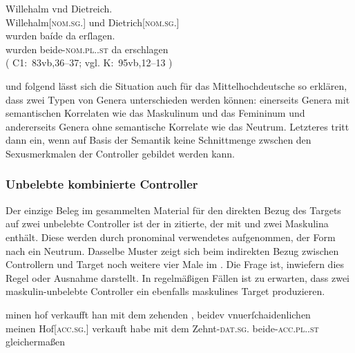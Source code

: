 \begin{exe}
\ex\label{ex:dietwill3}
		\gll Willehalm vnd Dietreich. \\
			Willehalm[\textsc{nom.sg.\MascM}] und Dietrich[\textsc{nom.sg.\MascM}] \\
	\sn \gll wurden baíde da erſlagen. \\
			wurden beide-\textsc{nom.pl.\MascM.st} da erschlagen \\
		\trans {}
			(%
				C1:~83vb,36--37; vgl.
				K:~95vb,12--13%
			)
\end{exe}

\citet[576]{wechsler2009} und \citet[182]{wechslerzlatic2003} folgend lässt
sich die Situation auch für das Mittelhochdeutsche so
erklären, dass zwei Typen von Genera unterschieden werden können:
einerseits Genera mit semantischen Korrelaten wie das Maskulinum und das
Femininum und andererseits Genera ohne semantische Korrelate wie das Neutrum.
Letzteres tritt dann ein, wenn auf Basis der Semantik keine Schnittmenge
zwschen den Sexusmerkmalen der Controller gebildet werden kann.


\subsubsection{Unbelebte kombinierte Controller}
\label{subsubsec:x+x_dir_inan}

Der einzige Beleg im gesammelten Material für den direkten Bezug des
Targets auf zwei unbelebte Controller ist der in
 zitierte, der mit   und
  zwei Maskulina enthält. Diese werden durch
pronominal verwendetes  aufgenommen, der Form nach ein Neutrum.
Dasselbe Muster zeigt sich beim indirekten Bezug zwischen Controllern und
Target noch weitere vier Male im \CAO{}. Die Frage ist, inwiefern dies Regel
oder Ausnahme darstellt. In regelmäßigen Fällen ist zu erwarten,
dass zwei maskulin-unbelebte Controller ein ebenfalls maskulines Target
produzieren.

\begin{exe}
\ex\label{ex:hofzehntbeidiu}
	\gll minen hof \textelp{} verkaufft han mit dem
			zehenden \textelp{}, beidev vnuerſchaidenlichen
			\\
			meinen Hof[\textsc{acc.sg.\MascI}] {} verkauft habe mit dem
			Zehnt-\textsc{dat.sg.\MascI} {} beide-\textsc{acc.pl.\NeutI.st}
			gleichermaßen
			\\
	\trans {}
		\parencites(Nr.~N~241, Augsburg, 1283)[195,37--39]{cao5}
\end{exe}

